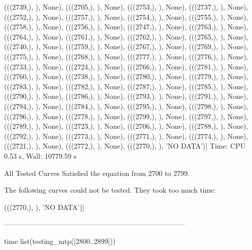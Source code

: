  (((2739,), {}), None),
 (((2705,), {}), None),
 (((2753,), {}), None),
 (((2737,), {}), None),
 (((2752,), {}), None),
 (((2757,), {}), None),
 (((2754,), {}), None),
 (((2755,), {}), None),
 (((2758,), {}), None),
 (((2756,), {}), None),
 (((2747,), {}), None),
 (((2763,), {}), None),
 (((2764,), {}), None),
 (((2761,), {}), None),
 (((2762,), {}), None),
 (((2765,), {}), None),
 (((2740,), {}), None),
 (((2759,), {}), None),
 (((2767,), {}), None),
 (((2769,), {}), None),
 (((2775,), {}), None),
 (((2768,), {}), None),
 (((2777,), {}), None),
 (((2776,), {}), None),
 (((2733,), {}), None),
 (((2724,), {}), None),
 (((2766,), {}), None),
 (((2781,), {}), None),
 (((2760,), {}), None),
 (((2738,), {}), None),
 (((2780,), {}), None),
 (((2779,), {}), None),
 (((2783,), {}), None),
 (((2782,), {}), None),
 (((2787,), {}), None),
 (((2785,), {}), None),
 (((2790,), {}), None),
 (((2786,), {}), None),
 (((2793,), {}), None),
 (((2791,), {}), None),
 (((2794,), {}), None),
 (((2784,), {}), None),
 (((2795,), {}), None),
 (((2798,), {}), None),
 (((2796,), {}), None),
 (((2778,), {}), None),
 (((2799,), {}), None),
 (((2797,), {}), None),
 (((2789,), {}), None),
 (((2723,), {}), None),
 (((2706,), {}), None),
 (((2788,), {}), None),
 (((2792,), {}), None),
 (((2773,), {}), None),
 (((2771,), {}), None),
 (((2774,), {}), None),
 (((2721,), {}), None),
 (((2772,), {}), None),
 (((2770,), {}), 'NO DATA')]
Time: CPU 0.53 s, Wall: 10779.59 s

All Tested Curves Satisfied the equation from 2700 to 2799.

The following curves could not be tested.
They took too much time:

(((2770,), {}), 'NO DATA')]

 -----------------------------------------------------------------------------

 
 time list(testing_mtp([2800..2899]))

